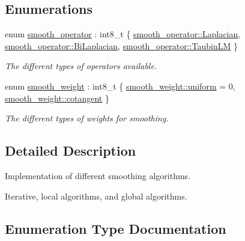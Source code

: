 \subsection*{Enumerations}
\begin{DoxyCompactItemize}
\item 
enum \hyperlink{namespacegeoproc_1_1smoothing_a64c2bfd1dda6cfbf39afa2e61fd62537}{smooth\+\_\+operator} \+: int8\+\_\+t \{ \hyperlink{namespacegeoproc_1_1smoothing_a64c2bfd1dda6cfbf39afa2e61fd62537a799723f39baf497704a3d39e7c03555f}{smooth\+\_\+operator\+::\+Laplacian}, 
\hyperlink{namespacegeoproc_1_1smoothing_a64c2bfd1dda6cfbf39afa2e61fd62537a0890724bffb79f511bc768c0529dce3f}{smooth\+\_\+operator\+::\+Bi\+Laplacian}, 
\hyperlink{namespacegeoproc_1_1smoothing_a64c2bfd1dda6cfbf39afa2e61fd62537ad69ec4945f39affa518f05fa077b00ae}{smooth\+\_\+operator\+::\+Taubin\+LM}
 \}\begin{DoxyCompactList}\small\item\em The different types of operators available. \end{DoxyCompactList}
\item 
enum \hyperlink{namespacegeoproc_1_1smoothing_a76e43f405426c150569712512de58028}{smooth\+\_\+weight} \+: int8\+\_\+t \{ \hyperlink{namespacegeoproc_1_1smoothing_a76e43f405426c150569712512de58028aa489ffed938ef1b9e86889bc413501ee}{smooth\+\_\+weight\+::uniform} = 0, 
\hyperlink{namespacegeoproc_1_1smoothing_a76e43f405426c150569712512de58028a8e8ea879f40475ae2c70be8b296bf950}{smooth\+\_\+weight\+::cotangent}
 \}\begin{DoxyCompactList}\small\item\em The different types of weights for smoothing. \end{DoxyCompactList}
\end{DoxyCompactItemize}


\subsection{Detailed Description}
Implementation of different smoothing algorithms. 

Iterative, local algorithms, and global algorithms. 

\subsection{Enumeration Type Documentation}
\mbox{\label{namespacegeoproc_1_1smoothing_a64c2bfd1dda6cfbf39afa2e61fd62537}} 
